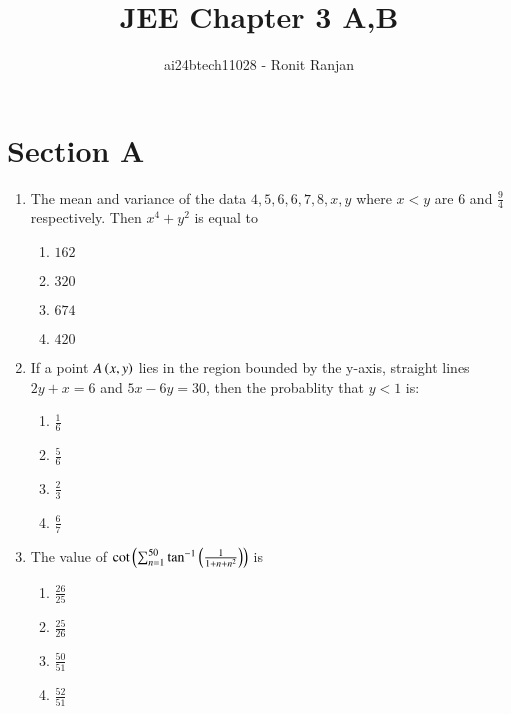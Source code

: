 \documentclass[journal,12pt,twocolumn]{IEEEtran}
\theoremstyle{remark}
\begin{document}

\vspace{3cm}

\title{JEE Chapter 3 A,B}
\author{ai24btech11028 - Ronit Ranjan}
\maketitle
\newpage
\bigskip

\section*{Section A}

\begin{enumerate}
    \item The mean and variance of the data $4, 5, 6, 6, 7, 8, x, y$ where $x < y$ are $6$ and $\frac{9}{4}$ respectively. Then $x^4 + y^2$ is equal to 
    \begin{multicols}{2}
    \begin{enumerate}
        \item $162$
        \item $320$
        \item $674$
        \item $420$
    \end{enumerate}
    \end{multicols}

    \item If a point $A\left(x, y\right)$ lies in the region bounded by the y-axis, straight lines $2y + x = 6$ and $5x - 6y = 30$, then the probablity that $y<1$ is:
    \begin{multicols}{2}
    \begin{enumerate}
        \item $\frac{1}{6}$
        \item $\frac{5}{6}$
        \item $\frac{2}{3}$
        \item $\frac{6}{7}$
    \end{enumerate}
    \end{multicols}    

    \item The value of $\cot \left( \sum_{n=1}^{50} \tan^{-1} \left( \frac{1}{1+n+n^2} \right)\right)$ is  
    \begin{multicols}{2}
    \begin{enumerate}
        \item $\frac{26}{25}$
        \item $\frac{25}{26}$
        \item $\frac{50}{51}$
        \item $\frac{52}{51}$
    \end{enumerate}
    \end{multicols}    


\end{enumerate}
\end{document}
